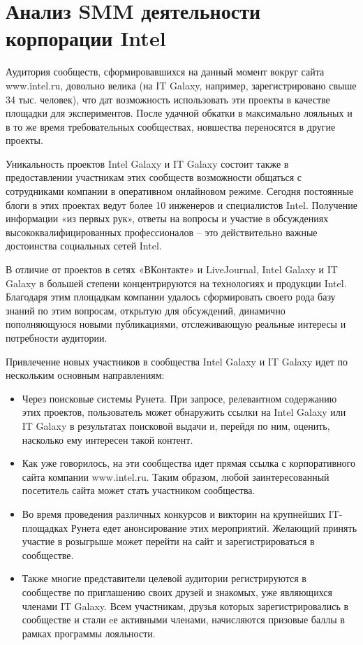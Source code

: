 \documentclass[a4paper,english,russian]{G2-105}
\begin{document}
\section{Анализ SMM деятельности корпорации Intel}
\par Аудитория сообществ, сформировавшихся на данный момент вокруг сайта www.intel.ru, довольно велика (на IT Galaxy, например, зарегистрировано свыше 34 тыс. человек), что дат возможность использовать эти проекты в качестве площадки для экспериментов. После удачной обкатки в максимально лояльных и в то же время требовательных сообществах, новшества переносятся в другие проекты.
\par Уникальность проектов Intel Galaxy и IT Galaxy состоит также в предоставлении участникам этих сообществ возможности общаться с сотрудниками компании в оперативном онлайновом режиме. Сегодня постоянные блоги в этих проектах ведут более 10 инженеров и специалистов Intel. Получение информации «из первых рук», ответы на вопросы и участие в обсуждениях высококвалифицированных профессионалов – это действительно важные достоинства социальных сетей Intel.
\par В отличие от проектов в сетях «ВКонтакте» и LiveJournal, Intel Galaxy и IT Galaxy в большей степени концентрируются на технологиях и продукции Intel. Благодаря этим площадкам компании удалось сформировать своего рода базу знаний по этим вопросам, открытую для обсуждений, динамично пополняющуюся новыми публикациями, отслеживающую реальные интересы и потребности аудитории.
\par Привлечение новых участников в сообщества Intel Galaxy и IT Galaxy идет по нескольким основным направлениям:
\begin{itemize}
\item Через поисковые системы Рунета. При запросе, релевантном содержанию этих проектов, пользователь может обнаружить ссылки на Intel Galaxy или IT Galaxy в результатах поисковой выдачи и, перейдя по ним, оценить, насколько ему интересен такой контент.
\item Как уже говорилось, на эти сообщества идет прямая ссылка с корпоративного сайта компании www.intel.ru. Таким образом, любой заинтересованный посетитель сайта может стать участником сообщества.
\item Во время проведения различных конкурсов и викторин на крупнейших IT-площадках Рунета едет анонсирование этих мероприятий. Желающий принять участие в розыгрыше может перейти на сайт и зарегистрироваться в сообществе.
\item Также многие представители целевой аудитории регистрируются в сообществе по приглашению своих друзей и знакомых, уже являющихся членами IT Galaxy. Всем участникам, друзья которых зарегистрировались в сообществе и стали eе активными членами, начисляются призовые баллы в рамках программы лояльности.
\end{itemize}
\end{document}
